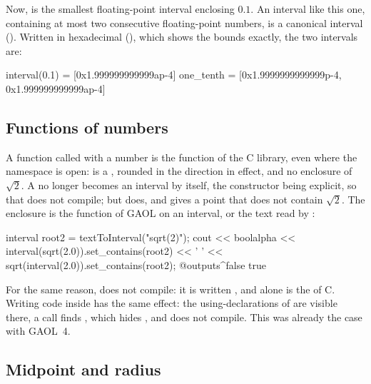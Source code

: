 \documentclass[12pt,a4paper,twoside,openright]{book}
\begin{document}
\noindent
Now,  is the smallest floating-point interval enclosing
$0.1$. An interval like this one, containing at most two consecutive
floating-point numbers, is a canonical interval
().
%
%
Written in hexadecimal (), which shows the bounds
exactly, the two intervals are:

\begin{onscreen}
interval(0.1) = [0x1.999999999999ap-4]
one_tenth     = [0x1.9999999999999p-4, 0x1.999999999999ap-4]
\end{onscreen}

\subsection{Functions of numbers}
%

A function called with a number is the function of the C library, even where
the namespace  is open:  is a ,
rounded in the direction in effect, and no enclosure of $\sqrt{2}$. A
 no longer becomes an interval by itself, the constructor being
explicit, so that  does not compile; but
 does, and gives a point that does not contain
$\sqrt{2}$. The enclosure is the function of GAOL on an interval, or the text
read by :\newinvfive

\begin{example}
interval root2 = textToInterval("sqrt(2)");
cout << boolalpha << interval(sqrt(2.0)).set_contains(root2) << ' '
     << sqrt(interval(2.0)).set_contains(root2);
@outputs^false true~
\end{example}

\noindent
For the same reason,  does not compile: it is written
, and  alone is the 
of C. Writing code inside  has the same effect: the
using-declarations of  are visible there, a call 
finds , which hides , and does not compile. This
was already the case with GAOL~4.

\subsection{Midpoint and radius}
%
\end{document}

